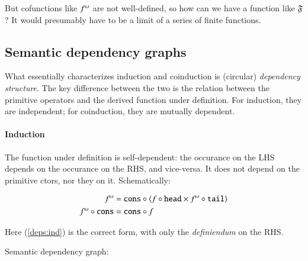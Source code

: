 But cofunctions like \(f^{\omega}\) are not well-defined, so how can
we have a function like \(\mathfrak{F}\)? It would presumably have to
be a limit of a series of finite functions.

\subsection{Semantic dependency graphs}

What essentially characterizes induction and coinduction is (circular)
\textit{dependency structure}. The key difference between the two is
the relation between the primitive operators and the derived function
under definition. For induction, they are independent; for
coinduction, they are mutually dependent.

\paragraph{Induction}

The function under definition is self-dependent: the occurance on the
LHS depends on the occurance on the RHS, and vice-versa. It does not
depend on the primitive ctors, nor they on it. Schematically:

\begin{align}
  f^{\omega} & = \texttt{\upshape cons}\circ \langle f\circ\texttt{\upshape head}\times f^{\omega}\circ\texttt{\upshape tail}\rangle \label{deps:ind} \\
  f^{\omega}\circ \texttt{\upshape cons} & = \texttt{\upshape cons}\circ f
\end{align}

Here (\ref{deps:ind}) is the correct form, with only the
\textit{definiendum} on the RHS.

Semantic dependency graph:

